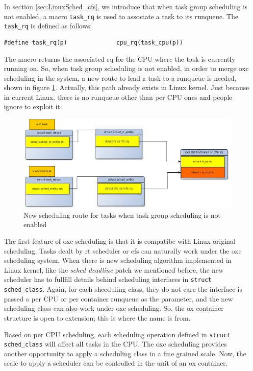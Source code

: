 In section \ref{sec:LinuxSched_cfs}, we introduce that when task group
scheduling is not enabled, a macro \texttt{task\_rq} is used to associate
a task to its runqueue. The \texttt{task\_rq} is defined as follows:
\begin{lstlisting}
#define task_rq(p)              cpu_rq(task_cpu(p))
\end{lstlisting}
The macro returns the associated rq for the CPU where the task is currently 
running on. So, when task group scheduling is not enabled, in order to merge
oxc scheduling in the system, a new route to lead a task to a runqueue is 
needed, shown in figure \ref{fig:oxc_task_no_tg}. Actually, this path already 
exists in Linux kernel. Just because in current Linux, there is no runqueue 
other than per CPU ones and people ignore to exploit it.  
\begin{figure}[htbp]
        \centering
        \includegraphics[width=\textwidth]{images/oxc_task_no_tg}
        \caption{New scheduling route for tasks when task group scheduling is not enabled}
        \label{fig:oxc_task_no_tg}
\end{figure}

The first feature of oxc scheduling is that it is compatibe with Linux original
scheduling. Tasks dealt by rt scheduler or cfs can naturally work under the
oxc scheduling system. When there is new scheduling algorithm implemented in
Linux kernel, like the \emph{sched deadline} patch we mentioned before, the
new scheduler has to fullfill details behind scheduling interfaces in 
\texttt{struct sched\_class}. Again, for each shceduling class, they do not
care the interface is passed a per CPU or per container runqueue as the
parameter, and the new scheduling class can also work under oxc scheduling.
So, the ox container structure is open to extension; this is where the name
is from.

Based on per CPU scheduling, each scheduling operation defined in 
\texttt{struct sched\_class} will affect all tasks in the CPU. The
oxc scheduling provides another opportunity to apply a scheduling class in a 
fine grained scale. Now, the scale to apply a scheduler can be controlled 
in the unit of an ox container. 
